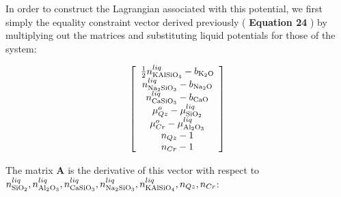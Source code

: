 \documentclass[11pt, titlepage, twoside]{article}
\begin{document}
In order to construct the Lagrangian associated with this potential, we first simply the equality constraint vector derived previously ( \textbf{Equation 24} ) by multiplying out the matrices and substituting liquid potentials for those of the system:


\begin{MPEquation}[!ht]
\begin{equation}
\left[ {\begin{array}{*{20}{c}}
{\frac{1}{2}n_{{\rm{KAlSi}}{{\rm{O}}_4}}^{liq} - {b_{{{\rm{K}}_2}{\rm{O}}}}}\\
{n_{{\rm{N}}{{\rm{a}}_2}{\rm{Si}}{{\rm{O}}_3}}^{liq} - {b_{{\rm{N}}{{\rm{a}}_2}{\rm{O}}}}}\\
{n_{{\rm{CaSi}}{{\rm{O}}_3}}^{liq} - {b_{{\rm{CaO}}}}}\\
{\mu _{Qz}^o - \mu _{{\rm{Si}}{{\rm{O}}_2}}^{liq}}\\
{\mu _{Cr}^o - \mu _{{\rm{A}}{{\rm{l}}_2}{{\rm{O}}_3}}^{liq}}\\
n_{Qz} - 1\\
n_{Cr} - 1
\end{array}} \right]
\end{equation}
\label{MPEquationElement:4D2AC1F9-11F5-48AF-9779-A103EE710260}
\end{MPEquation}
The matrix \textbf{A} is the derivative of this vector with respect to $n_{{\rm{Si}}{{\rm{O}}_2}}^{liq},n_{{\rm{A}}{{\rm{l}}_2}{{\rm{O}}_3}}^{liq},n_{{\rm{CaSi}}{{\rm{O}}_3}}^{liq},n_{{\rm{N}}{{\rm{a}}_2}{\rm{Si}}{{\rm{O}}_3}}^{liq},n_{{\rm{KAlSi}}{{\rm{O}}_4}}^{liq},{n_{Qz}},{n_{Cr}}$:
\end{document}
